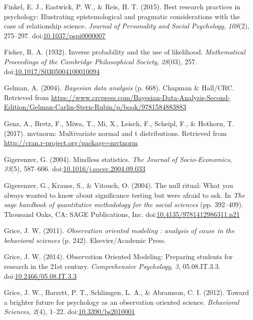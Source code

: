 \documentclass[english,man]{apa6}
\theoremstyle{definition}
\theoremstyle{definition}
\theoremstyle{definition}
\theoremstyle{remark}
\begin{document}
\hypertarget{ref-Finkel2015}{}
Finkel, E. J., Eastwick, P. W., \& Reis, H. T. (2015). Best research
practices in psychology: Illustrating epistemological and pragmatic
considerations with the case of relationship science. \emph{Journal of
Personality and Social Psychology}, \emph{108}(2), 275--297.
doi:\href{https://doi.org/10.1037/pspi0000007}{10.1037/pspi0000007}

\hypertarget{ref-Fisher1932}{}
Fisher, R. A. (1932). Inverse probability and the use of likelihood.
\emph{Mathematical Proceedings of the Cambridge Philosophical Society},
\emph{28}(03), 257.
doi:\href{https://doi.org/10.1017/S0305004100010094}{10.1017/S0305004100010094}

\hypertarget{ref-Gelman2004}{}
Gelman, A. (2004). \emph{Bayesian data analysis} (p. 668). Chapman \&
Hall/CRC. Retrieved from
\url{https://www.crcpress.com/Bayesian-Data-Analysis-Second-Edition/Gelman-Carlin-Stern-Rubin/p/book/9781584883883}

\hypertarget{ref-Genz2017}{}
Genz, A., Bretz, F., Miwa, T., Mi, X., Leisch, F., Scheipl, F., \&
Hothorn, T. (2017). mvtnorm: Multivariate normal and t distributions.
Retrieved from \url{http://cran.r-project.org/package=mvtnorm}

\hypertarget{ref-Gigerenzer2004}{}
Gigerenzer, G. (2004). Mindless statistics. \emph{The Journal of
Socio-Economics}, \emph{33}(5), 587--606.
doi:\href{https://doi.org/10.1016/j.socec.2004.09.033}{10.1016/j.socec.2004.09.033}

\hypertarget{ref-Gigerenzer2004a}{}
Gigerenzer, G., Krauss, S., \& Vitouch, O. (2004). The null ritual: What
you always wanted to know about significance testing but were afraid to
ask. In \emph{The sage handbook of quantitative methodology for the
social sciences} (pp. 392--409). Thousand Oaks, CA: SAGE Publications,
Inc.
doi:\href{https://doi.org/10.4135/9781412986311.n21}{10.4135/9781412986311.n21}

\hypertarget{ref-Grice2011}{}
Grice, J. W. (2011). \emph{Observation oriented modeling : analysis of
cause in the behavioral sciences} (p. 242). Elsevier/Academic Press.

\hypertarget{ref-Grice2014}{}
Grice, J. W. (2014). Observation Oriented Modeling: Preparing students
for research in the 21st century. \emph{Comprehensive Psychology},
\emph{3}, 05.08.IT.3.3.
doi:\href{https://doi.org/10.2466/05.08.IT.3.3}{10.2466/05.08.IT.3.3}

\hypertarget{ref-Grice2012}{}
Grice, J. W., Barrett, P. T., Schlimgen, L. A., \& Abramson, C. I.
(2012). Toward a brighter future for psychology as an observation
oriented science. \emph{Behavioral Sciences}, \emph{2}(4), 1--22.
doi:\href{https://doi.org/10.3390/bs2010001}{10.3390/bs2010001}
\end{document}
